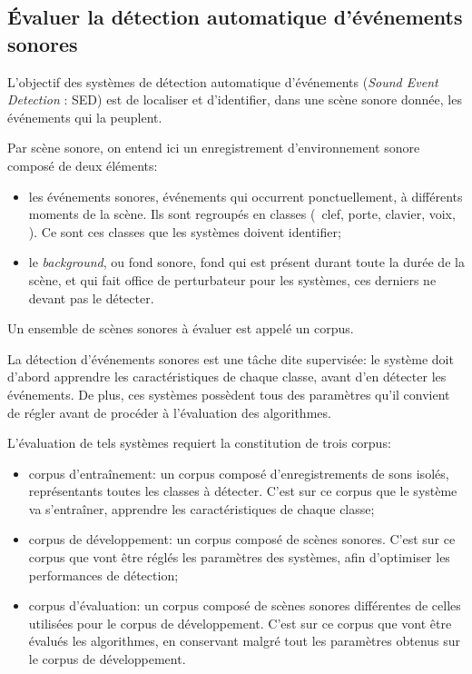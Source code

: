 \subsection[Évaluation]{Évaluer la détection automatique d'événements sonores}

L'objectif des systèmes de détection automatique d'événements (\textit{Sound Event Detection} : SED) est de localiser et d'identifier, dans une scène sonore donnée, les événements qui la peuplent.

Par scène sonore, on entend ici un enregistrement d'environnement sonore composé de deux éléments:

\begin{itemize}
\item les événements sonores, événements qui occurrent ponctuellement, à différents moments de la scène. Ils sont regroupés en classes (\eg~clef, porte, clavier, voix, \etc). Ce sont ces classes que les systèmes doivent identifier;
\item le \emph{background}, ou fond sonore, fond qui est présent durant toute la durée de la scène, et qui fait office de perturbateur pour les systèmes, ces derniers ne devant pas le détecter.
\end{itemize}

Un ensemble de scènes sonores à évaluer est appelé un corpus.

La détection d'événements sonores est une tâche dite supervisée: le système doit d'abord apprendre les caractéristiques de chaque classe, avant d'en détecter les événements. De plus, ces systèmes possèdent tous des paramètres qu'il convient de régler avant de procéder à l'évaluation des algorithmes.

L'évaluation de tels systèmes requiert la constitution de trois corpus:

\begin{itemize}
\item corpus d'entraînement: un corpus composé d'enregistrements de sons isolés, représentants toutes les classes à détecter. C'est sur ce corpus que le système va s'entraîner, apprendre les caractéristiques de chaque classe;
\item corpus de développement: un corpus composé de scènes sonores. C'est sur ce corpus que vont être réglés les paramètres des systèmes, afin d'optimiser les performances de détection;
\item corpus d'évaluation: un corpus composé de scènes sonores différentes de celles utilisées pour le corpus de développement. C'est sur ce corpus que vont être évalués les algorithmes, en conservant malgré tout les paramètres obtenus sur le corpus de développement.
\end{itemize}

